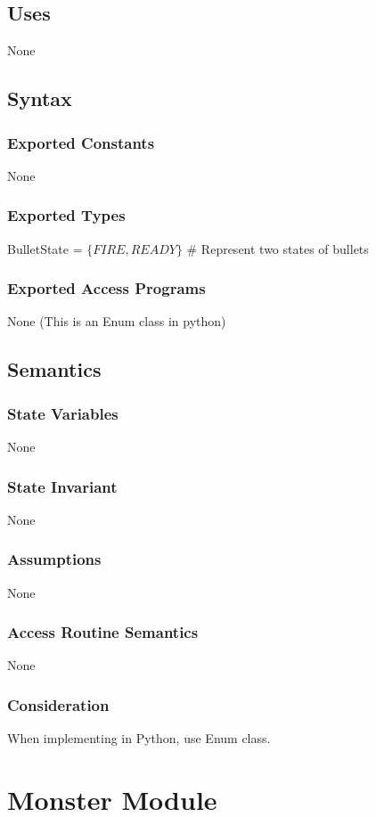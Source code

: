 \documentclass[12pt]{article}
\begin{document}
\subsection*{Uses}
None

\subsection*{Syntax}
\subsubsection*{Exported Constants}
None
\subsubsection*{Exported Types}
BulletState = $\{FIRE, READY\}$ \# Represent two states of bullets
\subsubsection*{Exported Access Programs}
None (This is an Enum class in python)

\subsection*{Semantics}
\subsubsection*{State Variables}
None
\subsubsection*{State Invariant}
None
\subsubsection*{Assumptions}
None
\subsubsection*{Access Routine Semantics}
None
\subsubsection*{Consideration}
When implementing in Python, use Enum class.
\newpage


\section{Monster Module}
\end{document}
